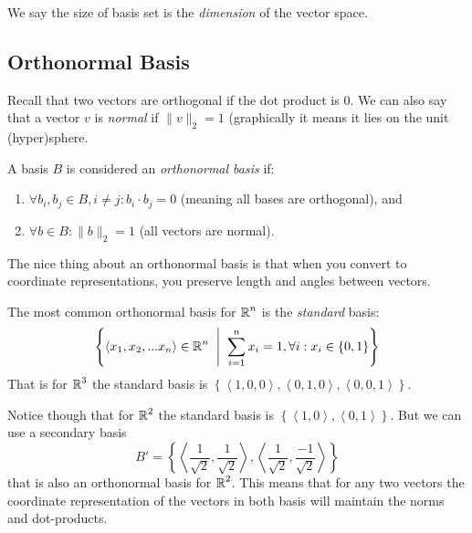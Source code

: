 We say the size of basis set is the \emph{dimension} of the vector space. 

\subsection{Orthonormal Basis}
Recall that two vectors are orthogonal if the dot product is 0. 
We can also say that a vector $v$ is \emph{normal} if $\|v\|_2=1$ (graphically it means it lies on the unit (hyper)sphere. 

A basis $B$ is considered an \emph{orthonormal basis} if:
\begin{enumerate}
\item $\forall b_i, b_j\in B, i\ne j: b_i \cdot b_j = 0$ (meaning all bases are orthogonal), and 
\item $\forall b \in B : \|b\|_2=1$ (all vectors are normal). 
\end{enumerate}

The nice thing about an orthonormal basis is that when you convert to coordinate representations, you preserve length and angles between vectors. 

The most common orthonormal basis for $\operatorname{\mathbb{R}}^n$ is the \emph{standard} basis: 
\[\left\{\left\langle x_1, x_2, ... x_n\right\rangle \in \operatorname{\mathbb{R}}^n \;\;\middle|\;\; \sum_{i=1}^n x_i = 1, \forall i : x_i \in \left\{0,1\right\}\right\}\]
That is for $\operatorname{\mathbb{R}}^3$ the standard basis is $\left\{\left\langle1,0,0\right\rangle,\left\langle0,1,0\right\rangle,\left\langle0,0,1\right\rangle\right\}$.

Notice though that for $\operatorname{\mathbb{R}}^2$ the standard basis is $\left\{\left\langle1,0\right\rangle,\left\langle0,1\right\rangle\right\}$.
But we can use a secondary basis \[B'=\left\{\left\langle\frac{1}{\sqrt{2}},\frac{1}{\sqrt{2}}\right\rangle,\left\langle\frac{1}{\sqrt{2}},\frac{-1}{\sqrt{2}}\right\rangle\right\}\] that is also an orthonormal basis for $\operatorname{\mathbb{R}}^2$. 
This means that for any two vectors the coordinate representation of the vectors in both basis will maintain the norms and dot-products. 

